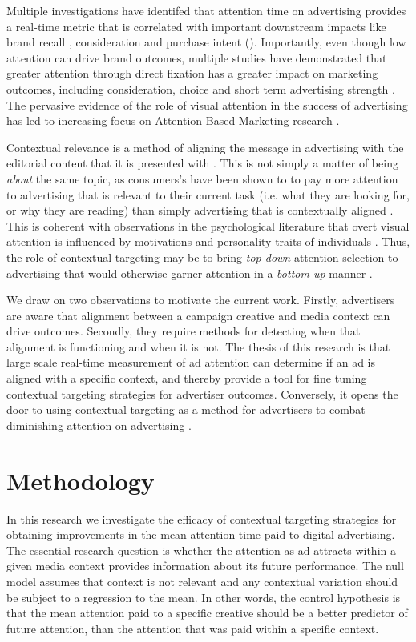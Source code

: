 \documentclass[sigconf]{acmart}
\begin{document}
Multiple investigations have identifed that attention time on advertising
provides a real-time metric that is correlated with important downstream
impacts like brand recall \cite{Lee2012}, consideration and purchase intent (\citeauthor{dentsu,PlaygroundXYZ}). Importantly, even though low attention can drive brand outcomes,
multiple studies have demonstrated that greater attention through direct
fixation has a greater impact on marketing outcomes, including
consideration, choice \cite{Santoso2021} and short term advertising
strength \cite{NelsonField}. The pervasive evidence of the role of visual attention
in the success of advertising has led to increasing focus on Attention Based Marketing
research \cite{Orquin2020}.

Contextual relevance is a method of aligning the message in advertising with the editorial
content that it is presented with \cite{Wang2011}. This is not simply a matter of
being \emph{about} the same topic, as consumers's have been shown to
to pay more attention to advertising that is relevant to their current task
(i.e. what they are looking for, or why they are reading) than simply advertising that
is contextually aligned \cite{Resnick2016}. This is coherent with observations
in the psychological literature that overt visual attention is influenced by motivations
and personality traits of individuals \cite{Kaspar2011}. Thus, the role of contextual
targeting may be to bring \emph{top-down} attention selection to advertising that would
otherwise garner attention in a \emph{bottom-up} manner \cite{Greenberg2013}.

We draw on two observations to motivate the current work. Firstly, advertisers are aware
that alignment between a campaign creative and media context can drive outcomes.
Secondly, they require methods for detecting when that alignment is functioning and
when it is not. The thesis of this research is that large scale real-time
measurement of ad attention can determine if an ad is aligned with a specific context,
and thereby provide a tool for fine tuning contextual targeting
strategies for advertiser outcomes. Conversely, it opens the door to using contextual
targeting as a method for advertisers to combat diminishing attention on
advertising \cite{Teixeira2014,Orquin2020}.

\section{Methodology}

In this research we investigate the efficacy of contextual targeting strategies
for obtaining improvements in the mean attention time paid to digital advertising.
The essential research question is whether the attention as ad attracts
within a given media context provides information about its future performance.
The null model assumes that context is not relevant and any contextual
variation should be subject to a regression to the mean.
In other words, the control hypothesis is that the mean attention paid to
a specific creative should be a better predictor of
future attention, than the attention that was paid within a specific context.
\end{document}

